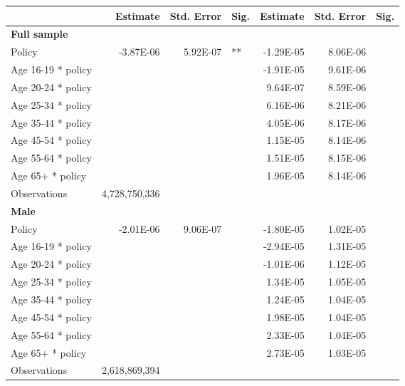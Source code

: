 
\begin{table}%
\centering 
\begin{tabular}{l r r l r r l} 

\hline 
 
 & Estimate & Std. Error & Sig. & Estimate & Std. Error & Sig. \\ 

\hline 
 
\textbf{Full sample} \\ 

Policy             &  -3.87E-06        &  5.92E-07       &   **       &  -1.29E-05        &  8.06E-06       &            \\ 
Age 16-19 * policy           & & &  &  -1.91E-05        &  9.61E-06       &            \\ 
Age 20-24 * policy           & & &  &  9.64E-07        &  8.59E-06       &            \\ 
Age 25-34 * policy           & & &  &  6.16E-06        &  8.21E-06       &            \\ 
Age 35-44 * policy           & & &  &  4.05E-06        &  8.17E-06       &            \\ 
Age 45-54 * policy           & & &  &  1.15E-05        &  8.14E-06       &            \\ 
Age 55-64 * policy           & & &  &  1.51E-05        &  8.15E-06       &            \\ 
Age 65+ * policy           & & &  &  1.96E-05        &  8.14E-06       &            \\ 
Observations & 4,728,750,336 \\ 


\hline 

\textbf{Male} \\ 

Policy             &  -2.01E-06        &  9.06E-07       &            &  -1.80E-05        &  1.02E-05       &            \\ 
Age 16-19 * policy           & & &  &  -2.94E-05        &  1.31E-05       &            \\ 
Age 20-24 * policy           & & &  &  -1.01E-06        &  1.12E-05       &            \\ 
Age 25-34 * policy           & & &  &  1.34E-05        &  1.05E-05       &            \\ 
Age 35-44 * policy           & & &  &  1.24E-05        &  1.04E-05       &            \\ 
Age 45-54 * policy           & & &  &  1.98E-05        &  1.04E-05       &            \\ 
Age 55-64 * policy           & & &  &  2.33E-05        &  1.04E-05       &            \\ 
Age 65+ * policy           & & &  &  2.73E-05        &  1.03E-05       &            \\ 
Observations & 2,618,869,394 \\ 



\end{tabular}
\end{table}
